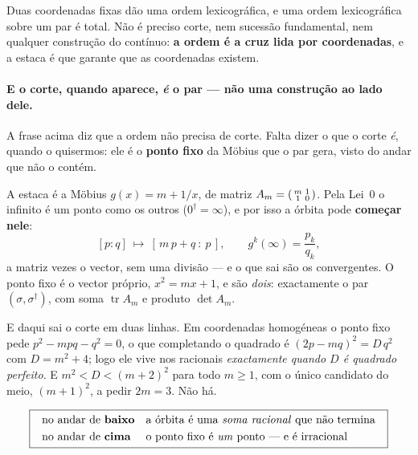 \documentclass[livro.tex]{subfiles}
\begin{document}
\noindent Duas coordenadas fixas dão uma ordem lexicográfica, e uma ordem lexicográfica sobre um
par é total. Não é preciso corte, nem sucessão fundamental, nem qualquer construção do contínuo:
\textbf{a ordem é a cruz lida por coordenadas}, e a estaca é que garante que as coordenadas
existem.


\paragraph{E o corte, quando aparece, \emph{é} o par --- não uma construção ao lado
dele.} A frase acima diz que a ordem não precisa de corte. Falta dizer o que o corte
\emph{é}, quando o quisermos: ele é o \textbf{ponto fixo} da Möbius que o par gera, visto
do andar que não o contém.

\noindent A estaca é a Möbius $g(x)=m+1/x$, de matriz
$A_m=\begin{psmallmatrix}m&1\\1&0\end{psmallmatrix}$. Pela Lei~$0$ o infinito é um ponto
como os outros ($0^{\dagger}=\infty$), e por isso a órbita pode \textbf{começar nele}:
\[
[p:q]\ \longmapsto\ [\,m\,p+q\ :\ p\,],
\qquad
g^{k}(\infty)=\frac{p_k}{q_k},
\]
a matriz vezes o vector, sem uma divisão --- e o que sai são os convergentes. O ponto fixo
é o vector próprio, $x^{2}=mx+1$, e são \emph{dois}: exactamente o par
$(\sigma,\sigma^{\dagger})$, com soma $\operatorname{tr}A_m$ e produto $\det A_m$.

\noindent E daqui sai o corte em duas linhas. Em coordenadas homogéneas o ponto fixo pede
$p^{2}-mpq-q^{2}=0$, o que completando o quadrado é
$(2p-mq)^{2}=D\,q^{2}$ com $D=m^{2}+4$; logo ele vive nos racionais \emph{exactamente
quando $D$ é quadrado perfeito}. E $m^{2}<D<(m+2)^{2}$ para todo $m\geq1$, com o único
candidato do meio, $(m+1)^{2}$, a pedir $2m=3$. Não há.

\[
\boxed{\;\begin{array}{ll}
\text{no andar de \textbf{baixo}} & \text{a órbita é uma \emph{soma racional} que não
termina}\\[3pt]
\text{no andar de \textbf{cima}} & \text{o ponto fixo é \emph{um} ponto --- e é irracional}
\end{array}\;}
\]
\end{document}
